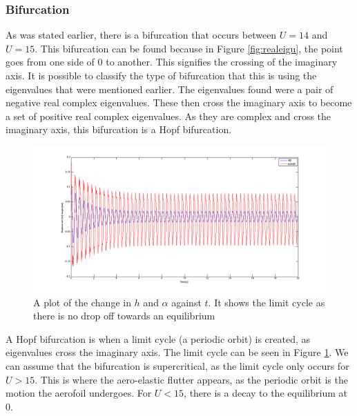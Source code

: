 \subsubsection{Bifurcation}
\noindent As was stated earlier, there is a bifurcation that occurs between $U=14$ and $U = 15$. This bifurcation can be found because in Figure \ref{fig:realeigu}, the point goes from one side of 0 to another. This signifies the crossing of the imaginary axis.
\noindent It is possible to classify the type of bifurcation that this is using the eigenvalues that were mentioned earlier. The eigenvalues found were a pair of negative real complex eigenvalues. These then cross the imaginary axis to become a set of positive real complex eigenvalues. As they are complex and cross the imaginary axis, this bifurcation is a Hopf bifurcation. \\
\begin{figure}[H]
\centering
\includegraphics[width=1.0\textwidth]{limitcycle.png}
\caption{\label{fig:limitcycle} A plot of the change in $h$ and $\alpha$ against $t$. It shows the limit cycle as there is no drop off towards an equilibrium}
\end{figure}


\noindent A Hopf bifurcation is when a limit cycle (a periodic orbit) is created, as eigenvalues cross the imaginary axis. The limit cycle can be seen in Figure \ref{fig:limitcycle}. We can assume that the bifurcation is supercritical, as the limit cycle only occurs for $U>15$. This is where the aero-elastic flutter appears, as the periodic orbit is the motion the aerofoil undergoes. For $U<15$, there is a decay to the equilibrium at 0. 
